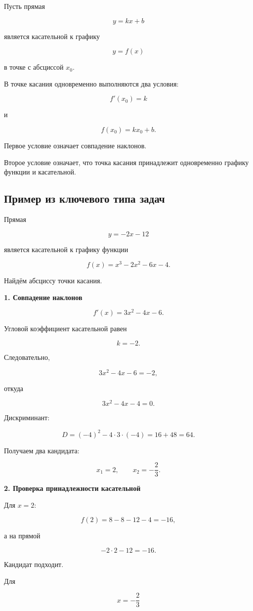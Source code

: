 \documentclass[a4paper,12pt]{article}
\begin{document}
Пусть прямая

\[
y=kx+b
\]

является касательной к графику

\[
y=f(x)
\]

в точке с абсциссой \(x_0\).

В точке касания одновременно выполняются два условия:

\[
\boxed{
f'(x_0)=k
}
\]

и

\[
\boxed{
f(x_0)=kx_0+b
}.
\]

Первое условие означает совпадение наклонов.

Второе условие означает, что точка касания принадлежит одновременно
графику функции и касательной.

\subsection*{Пример из ключевого типа задач}

Прямая

\[
y=-2x-12
\]

является касательной к графику функции

\[
f(x)=x^3-2x^2-6x-4.
\]

Найдём абсциссу точки касания.

\textbf{1. Совпадение наклонов}

\[
f'(x)=3x^2-4x-6.
\]

Угловой коэффициент касательной равен

\[
k=-2.
\]

Следовательно,

\[
3x^2-4x-6=-2,
\]

откуда

\[
3x^2-4x-4=0.
\]

Дискриминант:

\[
D=
(-4)^2
-
4\cdot3\cdot(-4)
=
16+48
=
64.
\]

Получаем два кандидата:

\[
x_1=2,
\qquad
x_2=-\frac23.
\]

\textbf{2. Проверка принадлежности касательной}

Для \(x=2\):

\[
f(2)
=
8-8-12-4
=
-16,
\]

а на прямой

\[
-2\cdot2-12
=
-16.
\]

Кандидат подходит.

Для

\[
x=-\frac23
\]
\end{document}
